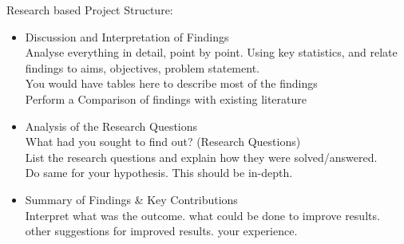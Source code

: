 Research based Project Structure:
\begin{itemize}
    \item Discussion and Interpretation of Findings \\
Analyse everything in detail, point by point. Using key statistics, and relate findings to aims, objectives, problem statement.\\
You would have tables here to describe most of the findings\\
Perform a Comparison of findings with existing literature

    \item Analysis of the Research Questions \\
What had you sought to find out? (Research Questions) \\
List the research questions and explain how they were solved/answered.\\
Do same for your hypothesis. This should be in-depth.

    \item Summary of Findings \& Key Contributions \\
Interpret what was the outcome. what could be done to improve results. other suggestions for improved results. your experience.
        
\end{itemize}
